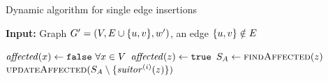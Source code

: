 \begin{algorithm}[t]
\footnotesize
\caption{\footnotesize Dynamic \suitor algorithm for single edge insertions}
\label{algo:dyn-suitor-single-ins}
\textbf{Input:} Graph $G' = (V, E \cup \set{u, v}, w')$, an edge $\set{u, v} \notin E$

\begin{algorithmic}[1]
\label{line:dyn-suitor-single-ins:check-affected}
\State$\mathit{affected}(x) \gets \texttt{false}\ \forall x\in V$
\State$\mathit{affected}(z) \gets \texttt{true}$
\State$S_A \gets \textsc{findAffected}(z)$
\State$\textsc{updateAffected}(S_A \setminus \{\mathit{suitor}^{(i)}(z)\})$
\label{line:dyn-suitor-single-ins:upd-aff}
\EndFor
\EndIf
\end{algorithmic}
\end{algorithm}
